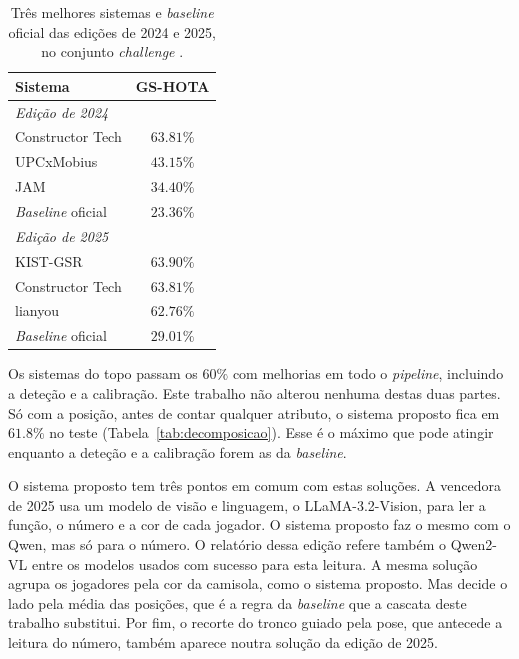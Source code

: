 \begin{table}[H]
    \centering
    \caption{Três melhores sistemas e \emph{baseline} oficial das edições de 2024 e 2025, no conjunto \emph{challenge} \citep{cioppa2024soccernet, giancola2025soccernet}.}
    \label{tab:leaderboard}
    \begin{tabular}{|l|c|}
        \hline
        \textbf{Sistema} & \textbf{GS-HOTA} \\
        \hline
        \multicolumn{2}{|l|}{\textit{Edição de 2024}} \\
        \hline
        Constructor Tech  & $63.81\%$ \\
        \hline
        UPCxMobius        & $43.15\%$ \\
        \hline
        JAM               & $34.40\%$ \\
        \hline
        \emph{Baseline} oficial & $23.36\%$ \\
        \hline
        \multicolumn{2}{|l|}{\textit{Edição de 2025}} \\
        \hline
        KIST-GSR          & $63.90\%$ \\
        \hline
        Constructor Tech  & $63.81\%$ \\
        \hline
        lianyou           & $62.76\%$ \\
        \hline
        \emph{Baseline} oficial & $29.01\%$ \\
        \hline
    \end{tabular}
\end{table}

Os sistemas do topo passam os $60\%$ com melhorias em todo o \emph{pipeline}, incluindo a deteção e a calibração. Este trabalho não alterou nenhuma destas duas partes. Só com a posição, antes de contar qualquer atributo, o sistema proposto fica em $61.8\%$ no teste (Tabela~\ref{tab:decomposicao}). Esse é o máximo que pode atingir enquanto a deteção e a calibração forem as da \emph{baseline}.

O sistema proposto tem três pontos em comum com estas soluções. A vencedora de 2025 \citep{oo2026broadcast2pitch} usa um modelo de visão e linguagem, o LLaMA-3.2-Vision, para ler a função, o número e a cor de cada jogador. O sistema proposto faz o mesmo com o Qwen, mas só para o número. O relatório dessa edição \citep{giancola2025soccernet} refere também o Qwen2-VL entre os modelos usados com sucesso para esta leitura. A mesma solução agrupa os jogadores pela cor da camisola, como o sistema proposto. Mas decide o lado pela média das posições, que é a regra da \emph{baseline} que a cascata deste trabalho substitui. Por fim, o recorte do tronco guiado pela pose, que antecede a leitura do número, também aparece noutra solução da edição de 2025.


